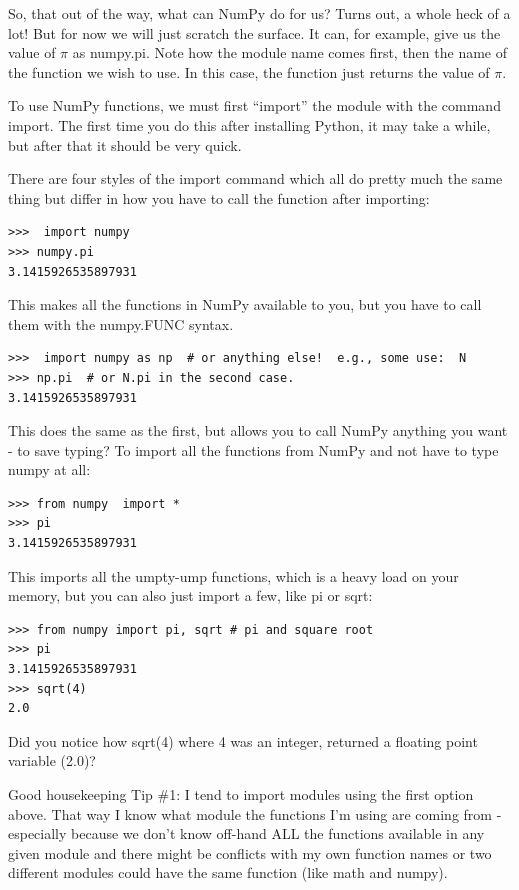 \documentclass[11pt]{book}
\begin{document}
So, that out of the way, what can NumPy do for us?  Turns out, a whole heck of a lot!  But for now we will just scratch the surface.   It can, for example, give us the value of $\pi$ as {\color{blue}numpy.pi}.  Note how the module name comes first, then the name of the function we wish to use.  In this case, the function just returns the value of $\pi$.  

To use {\color{blue}NumPy} functions, we must first ``import'' the module with the command {\color{blue}import}.  The first time you do this after installing Python, it may take a while, but after that it should be very quick.  

There are four styles of the import command which all do pretty much the same thing but differ in how you have to call the function after importing: 

{ \color{blue} \begin{verbatim}
>>>  import numpy
>>> numpy.pi
3.1415926535897931
\end{verbatim}}
\noindent
This makes all the functions in NumPy available to you, but you have to call them with the {\color{blue}numpy.FUNC} syntax.

{ \color{blue} \begin{verbatim}
>>>  import numpy as np  # or anything else!  e.g., some use:  N
>>> np.pi  # or N.pi in the second case.
3.1415926535897931
\end{verbatim}}
\noindent
This does the same as the first, but allows you to call NumPy anything you want - to save typing?
\noindent
To import all the functions from NumPy and not have to type numpy at all: 
{ \color{blue} \begin{verbatim}
>>> from numpy  import *
>>> pi
3.1415926535897931
\end{verbatim}}
\noindent
This imports all the umpty-ump functions, which is a heavy load on your memory,  but you can also just import a few, like {\color{blue}pi} or {\color{blue}sqrt}:
{ \color{blue} \begin{verbatim}
>>> from numpy import pi, sqrt # pi and square root
>>> pi
3.1415926535897931
>>> sqrt(4)
2.0
\end{verbatim}
}
\noindent
Did you notice how {\color{blue}sqrt(4)} where 4 was an integer, returned a floating point variable (2.0)?  

{\color{magenta}Good housekeeping Tip \#1:  I tend to import modules using the first option above.  That way  I know what module the functions I'm using are coming from - especially because we don't know off-hand ALL the functions available in any given module and there might be conflicts with my own function names or two different modules could have the same function (like} {\color{blue}math} {\color{magenta}and }{\color{blue}numpy}).  
\end{document}
